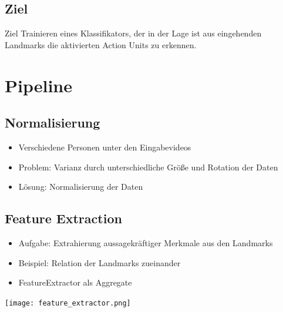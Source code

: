\documentclass{beamer}
\begin{document}
\subsection{Ziel}
\begin{frame}
  \begin{block}{Ziel}
    Trainieren eines Klassifikators, der in der Lage ist aus eingehenden Landmarks die aktivierten Action Units zu erkennen.
  \end{block}
  \pause
\end{frame}

\section{Pipeline}
\subsection{Normalisierung}
\begin{frame}
  \begin{itemize}
    \item Verschiedene Personen unter den Eingabevideos
    \item Problem: Varianz durch unterschiedliche Größe und Rotation der Daten
    \item Lösung: Normalisierung der Daten
  \end{itemize}
\end{frame}

\subsection{Feature Extraction}
\begin{frame}
  \begin{itemize}
    \item Aufgabe: Extrahierung aussagekräftiger Merkmale aus den Landmarks
    \item Beispiel: Relation der Landmarks zueinander
  \end{itemize}
\end{frame}

\begin{frame}
  \begin{itemize}
    \item FeatureExtractor als Aggregate
  \end{itemize}
  \begin{center}
    \texttt{[image: feature\_extractor.png]}
  \end{center}
\end{frame}
\end{document}

